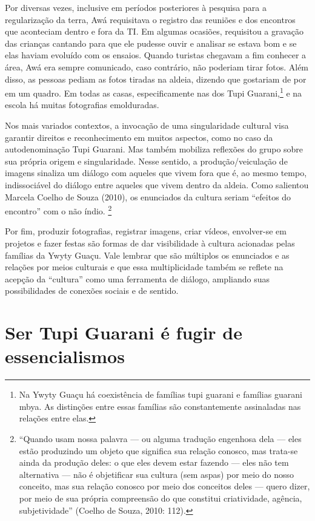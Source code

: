 Por diversas vezes, inclusive em períodos posteriores à pesquisa para a
regularização da terra, Awá requisitava o registro das reuniões e dos
encontros que aconteciam dentro e fora da TI. Em algumas ocasiões,
requisitou a gravação das crianças cantando para que ele pudesse ouvir
e analisar se estava bom e se elas haviam evoluído com os ensaios.
Quando turistas chegavam a fim conhecer a área, Awá era sempre
comunicado, caso contrário, não poderiam tirar fotos. Além disso, as
pessoas pediam as fotos tiradas na aldeia, dizendo que gostariam de por
em um quadro. Em todas as casas, especificamente nas dos Tupi
Guarani,\footnote{Na Ywyty Guaçu há coexistência de famílias tupi
guarani e famílias guarani mbya. As distinções entre essas famílias são
constantemente assinaladas nas relações entre elas.} e na escola há
muitas fotografias emolduradas.

Nos mais variados contextos, a invocação de uma singularidade cultural
visa garantir direitos e reconhecimento em muitos aspectos, como no
caso da autodenominação Tupi Guarani. Mas também mobiliza reflexões do
grupo sobre sua própria origem e singularidade. Nesse sentido, a
produção/veiculação de imagens sinaliza um diálogo com aqueles que
vivem fora que é, ao mesmo tempo, indissociável do diálogo entre
aqueles que vivem dentro da aldeia. Como salientou Marcela Coelho de
Souza (2010), os enunciados da cultura seriam ``efeitos do encontro'' com
o não índio. \footnote{``Quando usam nossa palavra — ou alguma tradução
engenhosa dela — eles estão produzindo um objeto que significa sua
relação conosco, mas trata-se ainda da produção deles: o que eles devem
estar fazendo — eles não tem alternativa — não é objetificar sua
cultura (sem aspas) por meio do nosso conceito, mas sua relação conosco
por meio dos conceitos deles — quero dizer, por meio de sua própria
compreensão do que constitui criatividade, agência, subjetividade''
(Coelho de Souza, 2010: 112).}

Por fim, produzir fotografias, registrar imagens, criar vídeos,
envolver-se em projetos e fazer festas são formas de dar visibilidade à
cultura acionadas pelas famílias da Ywyty Guaçu. Vale lembrar que são
múltiplos os enunciados e as relações por meios culturais e que essa
multiplicidade também se reflete na acepção da ``cultura'' como uma
ferramenta de diálogo, ampliando suas possibilidades de conexões
sociais e de sentido.

\section{Ser Tupi Guarani é fugir de essencialismos}

